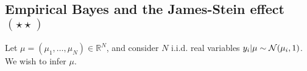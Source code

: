 \documentclass{article}
\newif\ifsolutions
\newcommand\solution[1]{
\ifsolutions
\begin{mdframed}[style=MyFrame]
\textcolor{bleu}{\textbf{Solution:} #1}
\end{mdframed}
\fi
}
\begin{document}
\solution{
Once you express the multinomial pdf, the Dirichlet distribution becomes the obvious conjugate prior. This time, we keep track of the normalizing constant, because the script requires it. This gives
 \begin{align*}
   p(\theta, y_{1:N}) &= p(y_{1:N}\vert\theta)p(\theta)\\
   &= \prod_{i=1}^N \prod_{k=1}^d \theta_k^{1_{\{y_i=k\}}} \times \frac{1}{B(\alpha)} \prod_{k=1}^d \theta_k^{\alpha_k -1} 1_{\theta\in \Delta_d}\\
   &= \frac{1}{B(\alpha)} \prod_{k=1}^d \theta_k^{\alpha_k +c_k -1} 1_{\theta\in \Delta_d}\\
   &=  \frac{B(\alpha+c)}{B(\alpha)} \text{Dir}(\theta\vert \alpha+c).
 \end{align*}
 }

 \subsection{Empirical Bayes and the James-Stein effect $(\star\star)$}
 Let $\mu =(\mu_1,\dots,\mu_N)\in \mathbb{R}^N$, and consider $N$ i.i.d. real variables $y_i\vert \mu \sim \mathcal{N}(\mu_i, 1)$. We wish to infer $\mu$.
\end{document}
